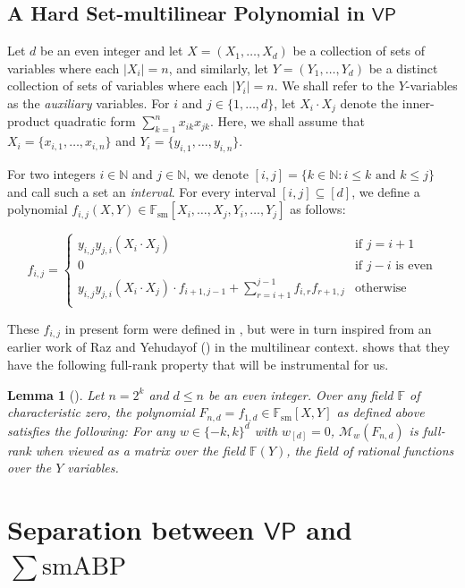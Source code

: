 \documentclass[10pt,a4paper]{article}
\newtheorem{lem}[theorem]{Lemma}
\theoremstyle{definition}%
\theoremstyle{plain}
\newcommand{\sbp}{\sum\mathrm{smABP}}
\newcommand{\VP}{\mathsf{VP}}
\newcommand{\N}{\mathbb N}
\newcommand{\F}{\mathbb F}
\newcommand{\Fsm}{\mathbb{F}_{\mathrm{sm}}}
\newcommand{\calM}{\mathcal{M}}
\begin{document}
\subsection{A Hard Set-multilinear Polynomial in $\VP$}\label{sec:VP}
Let $d$ be an even integer and let $X = (X_1,\ldots, X_{d})$ be a collection of sets of variables where each $|X_i| = n$, and similarly, let $Y = (Y_1,\ldots, Y_{d})$ be a distinct collection of sets of variables where each $|Y_i| = n$. We shall refer to the $Y$-variables as the \emph{auxiliary} variables. For $i$ and $j \in \{1,\ldots,d\}$, let $X_i \cdot X_j$ denote the inner-product quadratic form $\sum_{k = 1}^n x_{ik}x_{jk}$. Here, we shall assume that $X_i = \{x_{i,1},\ldots, x_{i,n}\}$ and $Y_i = \{y_{i,1},\ldots, y_{i,n}\}$.

For two integers $i \in \N$ and $j \in \N$, we denote $[i, j] = \{k \in \N : i \leq k \text{ and } k \leq j\}$ and call such a set an \emph{interval}. For every interval $[i, j] \subseteq [d]$, we define a polynomial $f_{i,j}(X,Y)\in \Fsm[X_i,\ldots,X_j,Y_i,\ldots, Y_j]$ as follows:

\[
f_{i,j} = \begin{cases}
y_{i,j}y_{j,i}(X_i\cdot X_j) &\text{if $j = i+1$}\\
0 &\text{if $j-i$ is even}\\
y_{i,j}y_{j,i}(X_i\cdot X_j)\cdot f_{i+1,j-1} + \sum_{r = i+1}^{j-1} f_{i,r}f_{r+1,j} &\text{otherwise}\\
\end{cases}
\]

These $f_{i,j}$ in present form were defined in \cite{KushS23}, but were in turn inspired from an earlier work of Raz and Yehudayof (\cite{RazY08}) in the multilinear context. \cite{KushS23} shows that they have the following full-rank property that will be instrumental for us.
\begin{lem}[\cite{KushS23}]\label{lem:Fn-VP-props}
    Let $n = 2^k$ and $d\leq n$ be an even integer. Over any field $\F$ of characteristic zero, the polynomial $F_{n,d} = f_{1,d}\in\Fsm[X,Y]$ as defined above satisfies the following: For any $w\in\{-k,k\}^d$ with $w_{[d]} = 0$, $\calM_w(F_{n,d})$ is full-rank when viewed as a matrix over the field $\F(Y)$, the field of rational functions over the $Y$ variables.
\end{lem}


\section{Separation between $\VP$ and $\sbp$}
\end{document}
